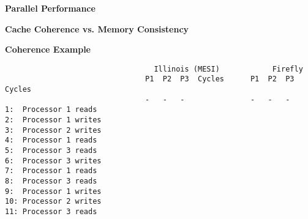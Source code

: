 \documentclass[12pt]{exam}
\begin{document}
\begin{questions}
    \question[10] \textbf{Parallel Performance}

    \begin{parts}
        \part %
        \part %
    \end{parts}

    \newpage

    \question[12] \textbf{Cache Coherence vs. Memory Consistency}

    \begin{parts}
        \part %
        \part %
        \part %
        \part %
        \part %
        \part %
    \end{parts}

    \newpage

    \question[16] \textbf{Coherence Example}
    \begin{verbatim}
                                  Illinois (MESI)            Firefly
                                P1  P2  P3  Cycles      P1  P2  P3  Cycles
                                -   -   -               -   -   -
1:  Processor 1 reads
2:  Processor 1 writes
3:  Processor 2 writes
4:  Processor 1 reads
5:  Processor 3 reads
6:  Processor 3 writes
7:  Processor 1 reads
8:  Processor 3 reads
9:  Processor 1 writes
10: Processor 2 writes
11: Processor 3 reads
    \end{verbatim}


\end{questions}
\end{document}
